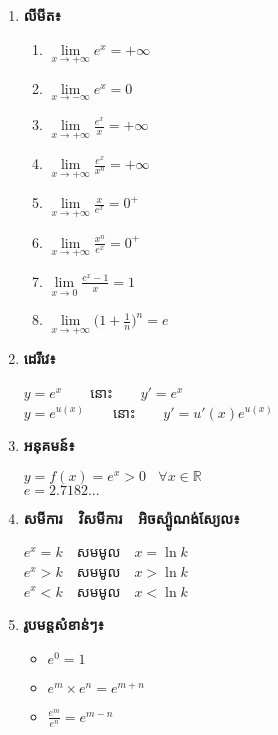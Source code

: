 \documentclass[12pt, a5paper]{article}
\begin{document}
\maketitle
\begin{enumerate}[m]
	\item \textbf{\sffamily លីមីត៖}
	\begin{enumerate}[k,2]
		\item $\lim\limits_{x\to+\infty}e^{x}=+\infty$
		\item $\lim\limits_{x\to-\infty}e^{x}=0$
		\item $\lim\limits_{x\to+\infty}\frac{e^x}{x}=+\infty$		
		\item $\lim\limits_{x\to+\infty}\frac{e^x}{x^n}=+\infty$
		\item $\lim\limits_{x\to+\infty}\frac{x}{e^x}=0^+$
		\item $\lim\limits_{x\to+\infty}\frac{x^n}{e^x}=0^+$
		\item $\lim\limits_{x\to 0}\frac{e^x-1}{x}=1$
		\item $\lim\limits_{x\to +\infty}\bigg(1+\frac{1}{n}\bigg)^n=e$
	\end{enumerate}
	\item \textbf{\sffamily ដេរីវេ៖}
	\begin{center}
		$y=e^x$~~~~នោះ~~~~$y'=e^x$\\
		$y=e^{u(x)}$~~~~នោះ~~~~$y'=u'(x)e^{u(x)}$
	\end{center}
	\item \textbf{\sffamily អនុគមន៍៖}
	\begin{center}
		$y=f(x)=e^x>0~~~~\forall x\in\mathbb{R}$\\
		$e=2.7182...$
	\end{center}
	\item \textbf{\sffamily សមីការ~~វិសមីការ~~អិចស្ប៉ូណង់ស្យែល៖}
	\begin{center}
		$e^x=k$~~សមមូល~~$x=\ln k$\\
		$e^x>k$~~សមមូល~~$x>\ln k$\\
		$e^x<k$~~សមមូល~~$x<\ln k$
	\end{center}\newpage
	\item \textbf{\sffamily រូបមន្តសំខាន់ៗ៖}
	\begin{multicols}{3}
		\begin{itemize}
			\item $e^0=1$
			\item $e^m\times e^n=e^{m+n}$
			\item $\frac{e^m}{e^n}=e^{m-n}$ 
		\end{itemize}

\end{multicols}
\end{enumerate}
\end{document}
